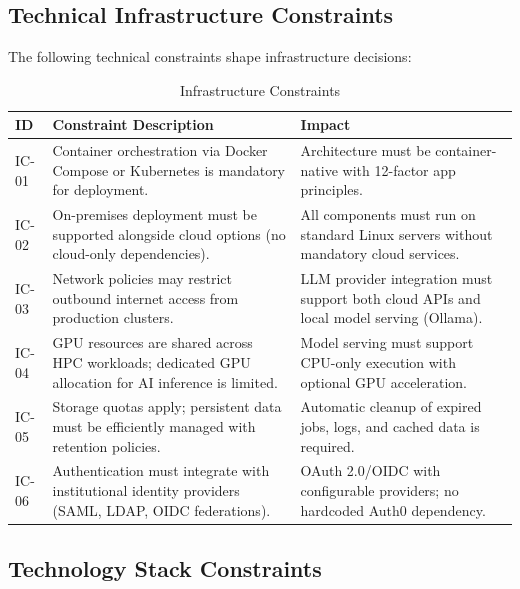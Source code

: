 \subsection{Technical Infrastructure Constraints}
\label{subsec:infrastructure-constraints}

The following technical constraints shape infrastructure decisions:

\begin{table}[htbp]
\centering
\caption{Infrastructure Constraints}
\label{tab:infrastructure-constraints}
\small
\begin{tabularx}{\textwidth}{|>{\raggedright\arraybackslash}p{1.2cm}|>{\raggedright\arraybackslash}X|>{\raggedright\arraybackslash}X|}
\hline
\textbf{ID} & \textbf{Constraint Description} & \textbf{Impact} \\
\hline
IC-01 & Container orchestration via Docker Compose or Kubernetes is mandatory for deployment. & Architecture must be container-native with 12-factor app principles. \\
\hline
IC-02 & On-premises deployment must be supported alongside cloud options (no cloud-only dependencies). & All components must run on standard Linux servers without mandatory cloud services. \\
\hline
IC-03 & Network policies may restrict outbound internet access from production clusters. & LLM provider integration must support both cloud APIs and local model serving (Ollama). \\
\hline
IC-04 & GPU resources are shared across HPC workloads; dedicated GPU allocation for AI inference is limited. & Model serving must support CPU-only execution with optional GPU acceleration. \\
\hline
IC-05 & Storage quotas apply; persistent data must be efficiently managed with retention policies. & Automatic cleanup of expired jobs, logs, and cached data is required. \\
\hline
IC-06 & Authentication must integrate with institutional identity providers (SAML, LDAP, OIDC federations). & OAuth 2.0/OIDC with configurable providers; no hardcoded Auth0 dependency. \\
\hline
\end{tabularx}
\end{table}

\subsection{Technology Stack Constraints}
\label{subsec:technology-constraints}

